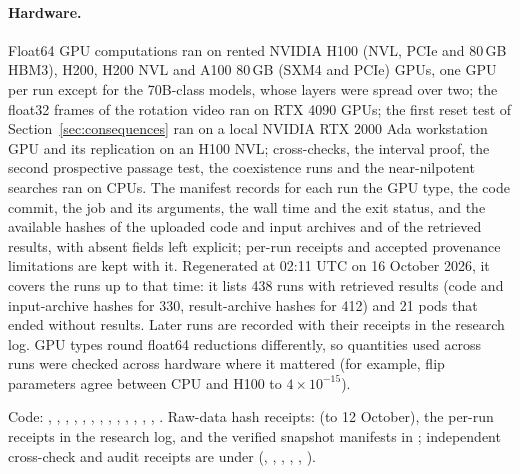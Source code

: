 \documentclass[11pt,letterpaper]{article}
\begin{document}
\paragraph{Hardware.} Float64 GPU computations ran on rented NVIDIA H100 (NVL, PCIe and 80\,GB HBM3), H200,
H200 NVL and A100 80\,GB (SXM4 and PCIe) GPUs, one GPU per run except for the 70B-class models, whose layers were
spread over two; the float32 frames of the rotation video ran on RTX 4090 GPUs; the first reset test of Section~\ref{sec:consequences} ran on a local NVIDIA RTX 2000 Ada workstation GPU and its replication on an H100 NVL; cross-checks, the interval
proof, the second prospective passage test, the coexistence runs and the near-nilpotent searches ran on CPUs. The manifest
 records for each run the GPU type, the code commit, the job and its
arguments, the wall time and the exit status, and the available hashes of the uploaded code and input archives and of
the retrieved results, with absent fields left explicit; per-run receipts and accepted provenance limitations are
kept with it. Regenerated at 02:11 UTC on 16 October 2026, it covers the runs up to that time: it lists 438 runs with retrieved results (code and
input-archive hashes for 330, result-archive hashes for 412) and 21 pods that ended without results. Later runs are
recorded with their receipts in the research log. GPU types round float64 reductions differently, so quantities used across runs
were checked across hardware where it mattered (for example, flip parameters agree between CPU and H100 to
$4\times10^{-15}$).
{\sloppy Code: , , ,
,
, , ,
, , , ,
, , . Raw-data hash
receipts:  (to 12 October), the per-run receipts in the research log,
and the verified snapshot manifests in ; independent cross-check and audit receipts are under
 (, , ,
, , ).\par}
\end{document}
